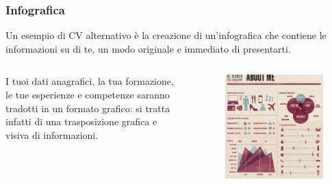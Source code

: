 \documentclass[handout]{beamer}
\begin{document}
\begin{frame}
\frametitle{Infografica}
Un esempio di CV alternativo è la creazione di un'\alert{infografica} che contiene le informazioni su di te, un modo originale e immediato di presentarti.\pause

\begin{columns}
  \begin{column}{.4\textwidth}
    I tuoi dati anagrafici, la tua formazione, le tue esperienze e competenze saranno tradotti in un formato grafico: si tratta infatti di una
    trasposizione grafica e visiva di informazioni.
  \end{column}
  \begin{column}{.4\textwidth}
    \begin{figure}
      \includegraphics[width=\columnwidth]{img/cvinfografica.png}
    \end{figure}
  \end{column}
\end{columns}
\end{frame}
\end{document}

